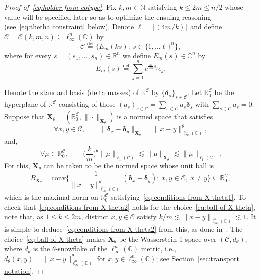 \documentclass[11pt,reqno]{amsart}
\renewcommand{\le}{\leqslant}
\newcommand{\bd}{\boldsymbol{\delta}}
\newcommand{\X}{\mathbf X}
\renewcommand{\bd}{\boldsymbol{\delta}}
\newcommand{\R}{\mathbb R}
\theoremstyle{remark}
\renewcommand{\subset}{\subseteq}
\newcommand{\C}{\mathbb C}
\newcommand{\N}{\mathbb N}
\newcommand{\eqdef}{\stackrel{\mathrm{def}}{=}}
\newcommand{\sub}{\mathscr{C}}
\renewcommand{\1}{\mathbf 1}
\newcommand{\conv}{\mathrm{conv}}
\begin{document}
\begin{proof}[Proof of~\eqref{eq:holder from cotype}] Fix $k,m\in \N$ satisfying $k\le 2m\le n/2$ whose value will be specified later so as to optimize the ensuing reasoning (see~\eqref{eq:thetha constraint} below). Denote $\ell= \lfloor (4m/k)\rfloor$ and define $\sub=\sub(k,m,n)\subset \ell_\infty^n(\C)$ by
$$
\sub\eqdef \big\{ E_m(ks):\ s\in \{1,\ldots \ell\}^n\big\},
$$
where for every $s=(s_1,\ldots, s_n)\in \R^n$ we define $E_m(s)\in \C^n$ by
$$
E_m(s)\eqdef \sum_{j=1}^n e^{\frac{\pi i}{2m}s_j}e_j.
$$

Denote  the standard  basis (delta masses) of $\R^\sub$ by $\{\bd_s\}_{s\in \sub}$. Let $\R^\sub_0$ be the hyperplane of $\R^\sub$ consisting of  those $(a_s)_{s\in \sub}=\sum_{s\in \sub} a_s\bd_s$ with $\sum_{s\in \sub} a_s=0$. Suppose that $\X_\theta=(\R^\sub_0,\|\cdot\|_{\X_\theta})$ is a normed space that satisfies
\begin{equation}\label{eq:conditions from X theta1}
\forall x,y\in \sub,\qquad \|\bd_x-\bd_y\|_{\X_\theta}= \|x-y\|_{\ell_\infty^n(\C)}^\theta,
\end{equation}
and,
\begin{equation}\label{eq:conditions from X theta2}
\forall\mu\in \R_0^\sub,\qquad \Big(\frac{k}{m}\Big)^\theta\|\mu\|_{\ell_1(\sub)}\lesssim \|\mu\|_{\X_\theta}\lesssim \|\mu\|_{\ell_1(\sub)}.
\end{equation}
For this, $\X_\theta$ can be taken to be the normed space whose unit ball is
\begin{equation}\label{eq:ball of X theta}
B_{\X_\theta}=\conv \Bigg\{\frac{1}{\|x-y\|_{\ell_\infty^n(\C)}^\theta}(\bd_x-\bd_y):\ x,y\in \sub,\ x\neq y\Bigg\}\subset \R^\sub_0,
\end{equation}
which is the maximal norm on $\R_0^\sub$ satisfying~\eqref{eq:conditions from X theta1}. To check that~\eqref{eq:conditions from X theta2} holds for the choice~\eqref{eq:ball of X theta}, note that, as $1\le k\le 2m$, distinct $x,y\in \sub$ satisfy $k/m \lesssim \|x-y\|_{\ell^n_\infty(\C)}\lesssim 1$. It is simple to deduce~\eqref{eq:conditions from X theta2} from this, as done in~\cite[Lemma~7]{NR17}. The choice~\eqref{eq:ball of X theta} makes $\X_\theta$ be the Wasserstein-1 space over $(\sub, d_\theta)$, where $d_\theta$ is the $\theta$-snowflake of the $\ell_\infty^n(\C)$  metric, i.e., $d_\theta(x,y)=\|x-y\|^\theta_{\ell_\infty^n(\C)}$ for $x,y\in \ell_\infty^n(\C)$; see Section~\ref{sec:transport notation}.



\end{proof}
\end{document}
